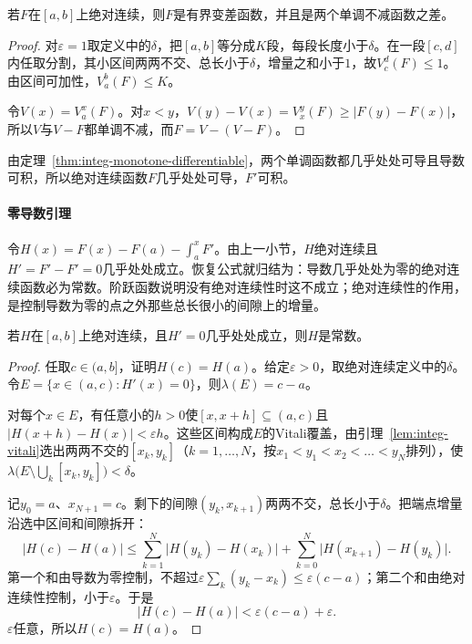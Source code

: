 \begin{lemma}[绝对连续函数有界变差]
\label{lem:integ-ac-bv}
若$F$在$[a,b]$上绝对连续，则$F$是有界变差函数，并且是两个单调不减函数之差。
\end{lemma}

\begin{proof}
对$\varepsilon=1$取定义中的$\delta$，把$[a,b]$等分成$K$段，每段长度小于$\delta$。在一段$[c,d]$内任取分割，其小区间两两不交、总长小于$\delta$，增量之和小于$1$，故$V_c^d(F)\leq1$。由区间可加性，$V_a^b(F)\leq K$。

令$V(x)=V_a^x(F)$。对$x<y$，$V(y)-V(x)=V_x^y(F)\geq\lvert F(y)-F(x)\rvert$，所以$V$与$V-F$都单调不减，而$F=V-(V-F)$。
\end{proof}

由定理~\ref{thm:integ-monotone-differentiable}，两个单调函数都几乎处处可导且导数可积，所以绝对连续函数$F$几乎处处可导，$F'$可积。

\paragraph{零导数引理}
令$H(x)=F(x)-F(a)-\int_a^xF'$。由上一小节，$H$绝对连续且$H'=F'-F'=0$几乎处处成立。恢复公式就归结为：导数几乎处处为零的绝对连续函数必为常数。阶跃函数说明没有绝对连续性时这不成立；绝对连续性的作用，是控制导数为零的点之外那些总长很小的间隙上的增量。

\begin{lemma}[零导数引理]
\label{lem:integ-zero-derivative}
若$H$在$[a,b]$上绝对连续，且$H'=0$几乎处处成立，则$H$是常数。
\end{lemma}

\begin{proof}
任取$c\in(a,b]$，证明$H(c)=H(a)$。给定$\varepsilon>0$，取绝对连续定义中的$\delta$。令$E=\{x\in(a,c):H'(x)=0\}$，则$\lambda(E)=c-a$。

对每个$x\in E$，有任意小的$h>0$使$[x,x+h]\subseteq(a,c)$且$\lvert H(x+h)-H(x)\rvert<\varepsilon h$。这些区间构成$E$的Vitali覆盖，由引理~\ref{lem:integ-vitali}选出两两不交的$[x_k,y_k]$（$k=1,\dots,N$，按$x_1<y_1<x_2<\dots<y_N$排列），使$\lambda\bigl(E\setminus\bigcup_k[x_k,y_k]\bigr)<\delta$。

记$y_0=a$、$x_{N+1}=c$。剩下的间隙$(y_k,x_{k+1})$两两不交，总长小于$\delta$。把端点增量沿选中区间和间隙拆开：
\[
 \lvert H(c)-H(a)\rvert\leq\sum_{k=1}^N\lvert H(y_k)-H(x_k)\rvert+\sum_{k=0}^N\lvert H(x_{k+1})-H(y_k)\rvert .
\]
第一个和由导数为零控制，不超过$\varepsilon\sum_k(y_k-x_k)\leq\varepsilon(c-a)$；第二个和由绝对连续性控制，小于$\varepsilon$。于是
\[
 \lvert H(c)-H(a)\rvert<\varepsilon(c-a)+\varepsilon .
\]
$\varepsilon$任意，所以$H(c)=H(a)$。
\end{proof}

